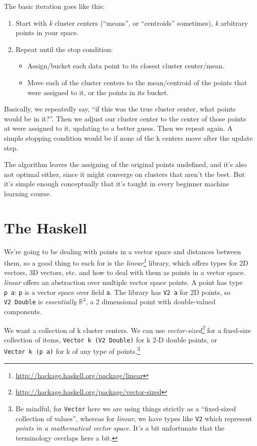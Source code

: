 \documentclass[]{article}
\renewcommand{\href}[2]{#2\footnote{\url{#1}}}
\begin{document}
The basic iteration goes like this:

\begin{enumerate}
\def\labelenumi{\arabic{enumi}.}
\tightlist
\item
  Start with \emph{k} cluster centers (``means'', or ``centroids'' sometimes),
  \emph{k} arbitrary points in your space.
\item
  Repeat until the stop condition:

  \begin{itemize}
  \tightlist
  \item
    Assign/bucket each data point to its closest cluster center/mean.
  \item
    Move each of the cluster centers to the mean/centroid of the points that
    were assigned to it, or the points in its bucket.
  \end{itemize}
\end{enumerate}

Basically, we repeatedly say, ``if this was the true cluster center, what points
would be in it?''. Then we adjust our cluster center to the center of those
points at were assigned to it, updating to a better guess. Then we repeat again.
A simple stopping condition would be if none of the k centers move after the
update step.

The algorithm leaves the assigning of the original points undefined, and it's
also not optimal either, since it might converge on clusters that aren't the
best. But it's simple enough conceptually that it's taught in every beginner
machine learning course.

\section{The Haskell}\label{the-haskell}

We're going to be dealing with points in a vector space and distances between
them, so a good thing to each for is the
\emph{\href{http://hackage.haskell.org/package/linear}{linear}} library, which
offers types for 2D vectors, 3D vectors, etc. and how to deal with them as
points in a vector space. \emph{linear} offers an abstraction over multiple
vector space points. A point has type \texttt{p\ a}: \texttt{p} is a vector
space over field \texttt{a}. The library has \texttt{V2\ a} for 2D points, so
\texttt{V2\ Double} is \emph{essentially} \(\mathbb{R}^2\), a 2 dimensional
point with double-valued components.

We want a collection of k cluster centers. We can use
\emph{\href{http://hackage.haskell.org/package/vector-sized}{vector-sized}} for
a fixed-size collection of items, \texttt{Vector\ k\ (V2\ Double)} for k 2-D
double points, or \texttt{Vector\ k\ (p\ a)} for k of any type of
points.\footnote{Be mindful, for \texttt{Vector} here we are using things
  strictly as a ``fixed-sized collection of values'', whereas for \emph{linear},
  we have types like \texttt{V2} which represent \emph{points in a mathematical
  vector space}. It's a bit unfortunate that the terminology overlaps here a
  bit.}
\end{document}
